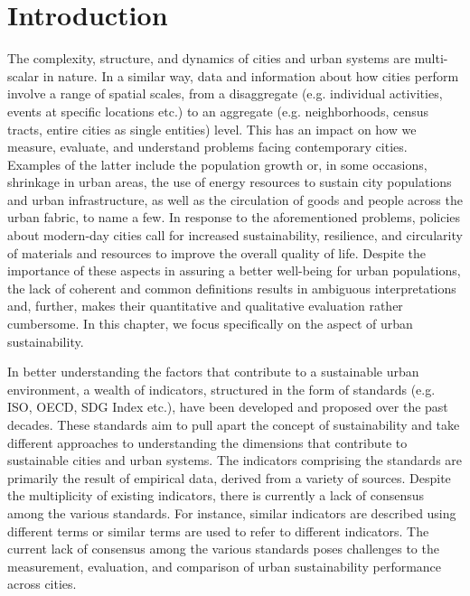\documentclass[preprint,12pt]{elsarticle}
\begin{document}
\section{Introduction}
The complexity, structure, and dynamics of cities and urban systems are multi-scalar in nature. In a similar way, data and information about how cities perform involve a range of spatial scales, from a disaggregate (e.g. individual activities, events at specific locations etc.) to an aggregate (e.g. neighborhoods, census tracts, entire cities as single entities) level. This has an impact on how we measure, evaluate, and understand problems facing contemporary cities. Examples of the latter include the population growth or, in some occasions, shrinkage in urban areas, the use of energy resources to sustain city populations and urban infrastructure, as well as the circulation of goods and people across the urban fabric, to name a few. In response to the aforementioned problems, policies about modern-day cities call for increased sustainability, resilience, and circularity of materials and resources to improve the overall quality of life. Despite the importance of these aspects in assuring a better well-being for urban populations, the lack of coherent and common definitions results in ambiguous interpretations and, further, makes their quantitative and qualitative evaluation rather cumbersome. In this chapter, we focus specifically on the aspect of urban sustainability.

In better understanding the factors that contribute to a sustainable urban environment, a wealth of indicators, structured in the form of standards (e.g. ISO, OECD, SDG Index etc.), have been developed and proposed over the past decades. These standards aim to pull apart the concept of sustainability and take different approaches to understanding the dimensions that contribute to sustainable cities and urban systems. The indicators comprising the standards are primarily the result of empirical data, derived from a variety of sources. Despite the multiplicity of existing indicators, there is currently a lack of consensus among the various standards. For instance, similar indicators are described using different terms or similar terms are used to refer to different indicators.
The current lack of consensus among the various standards poses challenges to the measurement, evaluation, and comparison of urban sustainability performance across cities.
\end{document}
